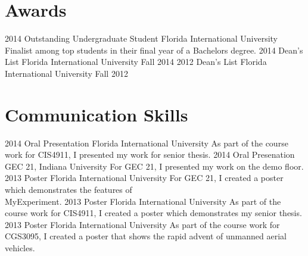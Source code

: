 \documentclass[]{friggeri-cv} %
\begin{document}

\section{Awards}
\begin{entrylist}
\entry
{2014}
{Outstanding Undergraduate Student}
{Florida International University}
{Finalist among top students in their final year of a Bachelors degree.}
\entry
{2014}
{Dean's List}
{Florida International University}
{Fall 2014}
\entry
{2012}
{Dean's List}
{Florida International University}
{Fall 2012}
\end{entrylist}

\clearpage
\section{Communication Skills}
\begin{entrylist}
\entry
{2014}
{Oral Presentation}
{Florida International University}
{As part of the course work for CIS4911, I presented my work for senior thesis.}
\entry
{2014}
{Oral Presenation}
{GEC 21, Indiana University}
{For GEC 21, I presented my work on the demo floor.}
\entry
{2013}
{Poster}
{Florida International University}
{For GEC 21, I created a poster which demonstrates the features of \\MyExperiment.}
\entry
{2013}
{Poster}
{Florida International University}
{As part of the course work for CIS4911, I created a poster which demonstrates my senior thesis.}
\entry
{2013}
{Poster}
{Florida International University}
{As part of the course work for CGS3095, I created a poster that shows the rapid advent of unmanned aerial vehicles.}
\end{entrylist}
\end{document}
